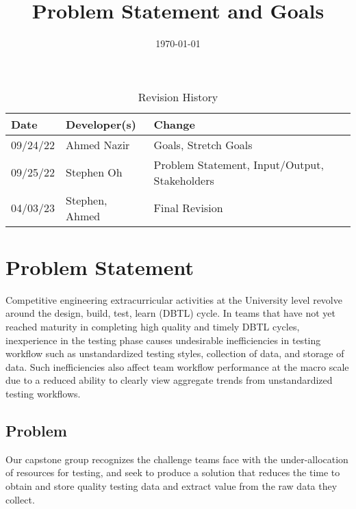 \documentclass[12pt]{article}
\title{Problem Statement and Goals\\\progname}
\author{\authname}
\date{\today}
\begin{document}
\maketitle
\newpage

\begin{table}[hp]
\caption{Revision History} \label{TblRevisionHistory}
\begin{tabularx}{\textwidth}{llX}
\toprule
\textbf{Date} & \textbf{Developer(s)} & \textbf{Change}\\
\midrule
09/24/22 & Ahmed Nazir & Goals, Stretch Goals\\
09/25/22 & Stephen Oh & Problem Statement, Input/Output, Stakeholders\\
04/03/23 & Stephen, Ahmed & Final Revision\\
\bottomrule
\end{tabularx}
\end{table}

\newpage
\tableofcontents
\listoftables


\newpage
\section{Problem Statement}

Competitive engineering extracurricular activities at the University level revolve around the design, build,
test, learn (DBTL) cycle. In teams that have not yet reached maturity in completing high quality and
timely DBTL cycles, inexperience in the testing phase causes undesirable inefficiencies in testing
workflow such as unstandardized testing styles, collection of data, and storage of data. Such
inefficiencies also affect team workflow performance at the macro scale due to a reduced ability to
clearly view aggregate trends from unstandardized testing workflows. 

\subsection{Problem}

Our capstone group recognizes the challenge teams face with the under-allocation of resources for testing, and seek to produce a solution that reduces the time to obtain and store quality testing data and extract value from the raw data they collect. \\ 
\end{document}
